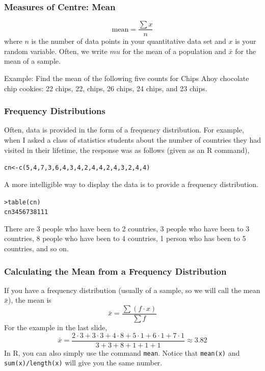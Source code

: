 \documentclass[xcolor=dvipsnames]{beamer}
\begin{document}
\begin{frame}
  \frametitle{Measures of Centre: Mean}
  \begin{equation}
    \label{eq:daechuev}
    \mbox{mean}=\frac{\sum{}x}{n}
  \end{equation}
where $n$ is the number of data points in your quantitative data set
and $x$ is your random variable. Often, we write $mu$ for the mean of
a population and $\bar{x}$ for the mean of a sample.

\bigskip

Example: Find the mean of the following five counts for Chips Ahoy
chocolate chip cookies: 22 chips, 22, chips, 26 chips, 24 chips, and
23 chips.
\end{frame}

\begin{frame}
  \frametitle{Frequency Distributions}
Often, data is provided in the form of a frequency distribution. For
example, when I asked a class of statistics students about the number
of countries they had visited in their lifetime, the response was as
follows (given as an R command),
\begin{alltt}
\small
cn<-c(5,4,7,3,6,4,3,4,2,4,4,2,4,3,2,4,4)
\end{alltt}
A more intelligible way to display the data is to provide a frequency
distribution.
\begin{alltt}
> table(cn)\newline
cn 3 4 5 6 7  3 8 1 1 1
\end{alltt}
There are 3 people who have been to 2 countries, 3 people who have
been to 3 countries, 8 people who have been to 4 countries, 1 person
who has been to 5 countries, and so on.
\end{frame}

\begin{frame}
  \frametitle{Calculating the Mean from a Frequency Distribution}
If you have a frequency distribution (usually of a sample, so we will
call the mean $\bar{x}$), the mean is 
\begin{equation}
  \label{eq:eogheivi}
  \bar{x}=\frac{\sum{}\left(f\cdot{}x\right)}{\sum{}f}
\end{equation}
For the example in the last slide,
\begin{equation}
  \label{eq:uevuemoo}
  \bar{x}=\frac{2\cdot{}3+3\cdot{}3+4\cdot{}8+5\cdot{}1+6\cdot{}1+7\cdot{}1}{3+3+8+1+1+1}\approx{}3.82
\end{equation}
In R, you can also simply use the command \texttt{mean}. Notice that
\texttt{mean(x)} and \texttt{sum(x)/length(x)} will give you the same
number.
\end{frame}
\end{document}
